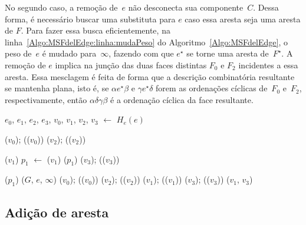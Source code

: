 No segundo caso, a remoção de~$e$ não desconecta sua componente~$C$.
Dessa forma, é necessário buscar uma substituta para $e$ caso essa aresta seja uma aresta de $F$.
Para fazer essa busca eficientemente, na linha~\ref{Algo:MSFdelEdge:linha:mudaPeso} do Algoritmo~\ref{Algo:MSFdelEdge}, o peso de~$e$ é mudado para~$\infty$, fazendo com que $e^\star$ se torne uma aresta de~$F^\star$. 
A remoção de $e$ implica na junção das duas faces distintas $F_0$ e $F_2$ incidentes a essa aresta.
Essa mesclagem é feita de forma que a descrição combinatória resultante se mantenha plana, isto é, se $\alpha e^\star \beta$ e $\gamma e^\star \delta$ forem as ordenações cíclicas de~$F_0$ e~$F_2$, respectivamente, então $\alpha \delta\gamma\beta$ é a ordenação cíclica da face resultante.

\begin{algorithm}[hbt]
\caption{\MSFdelEdge($G$, $e$)}
\label{Algo:MSFdelEdge}
\begin{algorithmic}[1]
\State $e_0$, $e_1$, $e_2$, $e_3$, $v_0$, $v_1$, $v_2$, $v_3$ $\gets$ $H_e(e)$
	\label{Algo:MSFdelEdge:linha2}

\State \LCOCycle($v_0$); \LCOSplit(\treapPredecessor($v_0$))\label{Algo:MSFdelEdge:linha3}
\State \LCOCycle($v_2$); \LCOSplit(\treapPredecessor($v_2$))

\State \LCOCycle($v_1$)
\State $p_1$ $\gets$ \treapPredecessor($v_1$)
\State \LCOSplit($p_1$)
\State \LCOCycle($v_3$); \LCOSplit(\treapPredecessor($v_3$))

\State \LCOSplit($p_1$) \label{Algo:MSFdelEdge:linha12}
\Else{}
\State \MSFupdate($G$, $e$, $\infty$)\label{Algo:MSFdelEdge:linha:mudaPeso}
\State \LCOCycle($v_0$); \LCOSplit(\treapPredecessor($v_0$))
\State \LCOCycle($v_2$); \LCOSplit(\treapPredecessor($v_2$))
\State \LCOCycle($v_1$); \LCOSplit(\treapPredecessor($v_1$))
\State \LCOCycle($v_3$); \LCOSplit(\treapPredecessor($v_3$))
\State \LCOMerge($v_1$, $v_3$)
\EndIf
\end{algorithmic}
\end{algorithm}

\subsection{Adição de aresta}

